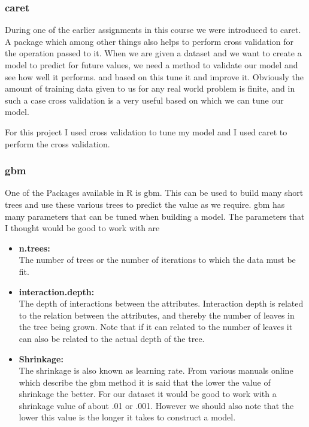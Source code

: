 \documentclass[paper=a4, fontsize=11pt]{scrartcl}	%
\numberwithin{equation}{section}		%
\numberwithin{figure}{section}			%
\numberwithin{table}{section}				%
\begin{document}
\subsubsection{caret}

During one of the earlier assignments in this course we were introduced to caret. A package which among other things also helps to perform cross validation for the operation passed to it. When we are given a dataset and we want to create a model to predict for future values, we need a method to validate our model and see how well it performs. and based on this tune it and improve it. Obviously the amount of training data given to us for any real world problem is finite, and in such a case cross validation is a very useful based on which we can tune our model.

For this project I used cross validation to tune my model and I used caret to perform the cross validation.

\subsubsection{gbm}

One of the Packages available in R is gbm. This can be used to build many short trees and use these various trees to predict the value as we require. gbm has many parameters that can be tuned when building a model. The parameters that I thought would be good to work with are

\begin{itemize}
	\item
	\textbf{n.trees:}\\
		The number of trees or the number of iterations to which the data must be fit.
	\item
	\textbf{interaction.depth:}\\
		The depth of interactions between the attributes. Interaction depth is related to the relation between the attributes, and thereby the number of leaves in the tree being grown. Note that if it can related to the number of leaves it can also be related to the actual depth of the tree.
	\item
	\textbf{Shrinkage:}\\
		The shrinkage is also known as learning rate. From various manuals online which describe the gbm method it is said that the lower the value of shrinkage the better. For our dataset it would be good to work with a shrinkage value of about .01 or .001. However we should also note that the lower this value is the longer it takes to construct a model.
\end{itemize}
\end{document}
